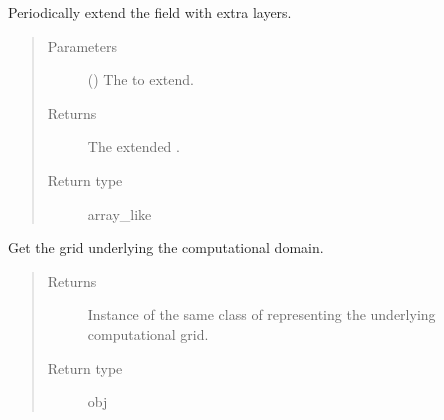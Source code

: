 \documentclass[letterpaper,10pt,english]{sphinxmanual}
\begin{document}
\begin{fulllineitems}
\begin{fulllineitems}
\end{fulllineitems}


\begin{fulllineitems}
\label{\detokenize{api:tasmania.dycore.horizontal_boundary_periodic.Periodic.from_physical_to_computational_domain}}
Periodically extend the field  with  extra layers.
\begin{quote}\begin{description}
\item[{Parameters}] \leavevmode
{} () \textendash{} The  to extend.

\item[{Returns}] \leavevmode
The extended .

\item[{Return type}] \leavevmode
array\_like

\end{description}\end{quote}

\end{fulllineitems}


\begin{fulllineitems}
\label{\detokenize{api:tasmania.dycore.horizontal_boundary_periodic.Periodic.get_computational_grid}}
Get the  grid underlying the computational domain.
\begin{quote}\begin{description}
\item[{Returns}] \leavevmode
Instance of the same class of 
representing the underlying computational grid.

\item[{Return type}] \leavevmode
obj


\end{description}
\end{quote}
\end{fulllineitems}
\end{fulllineitems}
\end{document}
